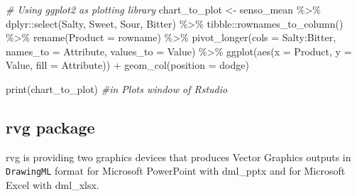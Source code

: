 \documentclass[
]{book}
\newenvironment{Shaded}{\begin{snugshade}}{\end{snugshade}}
\newcommand{\AttributeTok}[1]{\textcolor[rgb]{0.77,0.63,0.00}{#1}}
\newcommand{\CommentTok}[1]{\textcolor[rgb]{0.56,0.35,0.01}{\textit{#1}}}
\newcommand{\FunctionTok}[1]{\textcolor[rgb]{0.00,0.00,0.00}{#1}}
\newcommand{\NormalTok}[1]{#1}
\newcommand{\OtherTok}[1]{\textcolor[rgb]{0.56,0.35,0.01}{#1}}
\newcommand{\SpecialCharTok}[1]{\textcolor[rgb]{0.00,0.00,0.00}{#1}}
\newcommand{\StringTok}[1]{\textcolor[rgb]{0.31,0.60,0.02}{#1}}
\begin{document}
\begin{Shaded}
\begin{Highlighting}[]
\CommentTok{\# Using ggplot2 as plotting library}
\NormalTok{chart\_to\_plot }\OtherTok{\textless{}{-}}\NormalTok{ senso\_mean }\SpecialCharTok{\%\textgreater{}\%}
\NormalTok{  dplyr}\SpecialCharTok{::}\FunctionTok{select}\NormalTok{(Salty, Sweet, Sour, Bitter) }\SpecialCharTok{\%\textgreater{}\%} 
\NormalTok{  tibble}\SpecialCharTok{::}\FunctionTok{rownames\_to\_column}\NormalTok{() }\SpecialCharTok{\%\textgreater{}\%} 
  \FunctionTok{rename}\NormalTok{(}\AttributeTok{Product =}\NormalTok{ rowname) }\SpecialCharTok{\%\textgreater{}\%}
  \FunctionTok{pivot\_longer}\NormalTok{(}\AttributeTok{cols =}\NormalTok{ Salty}\SpecialCharTok{:}\NormalTok{Bitter, }\AttributeTok{names\_to =} \StringTok{\textquotesingle{}Attribute\textquotesingle{}}\NormalTok{, }\AttributeTok{values\_to =} \StringTok{\textquotesingle{}Value\textquotesingle{}}\NormalTok{) }\SpecialCharTok{\%\textgreater{}\%} 
  \FunctionTok{ggplot}\NormalTok{(}\FunctionTok{aes}\NormalTok{(}\AttributeTok{x =}\NormalTok{ Product, }\AttributeTok{y =}\NormalTok{ Value, }\AttributeTok{fill =}\NormalTok{ Attribute)) }\SpecialCharTok{+} 
  \FunctionTok{geom\_col}\NormalTok{(}\AttributeTok{position =} \StringTok{\textquotesingle{}dodge\textquotesingle{}}\NormalTok{)}

\FunctionTok{print}\NormalTok{(chart\_to\_plot) }\CommentTok{\#in Plots window of Rstudio}
\end{Highlighting}
\end{Shaded}

\hypertarget{rvg-package}{%
\subsection{rvg package}\label{rvg-package}}

rvg is providing two graphics devices that produces Vector Graphics outputs in \texttt{DrawingML} format for Microsoft PowerPoint with dml\_pptx and for Microsoft Excel with dml\_xlsx.
\end{document}
